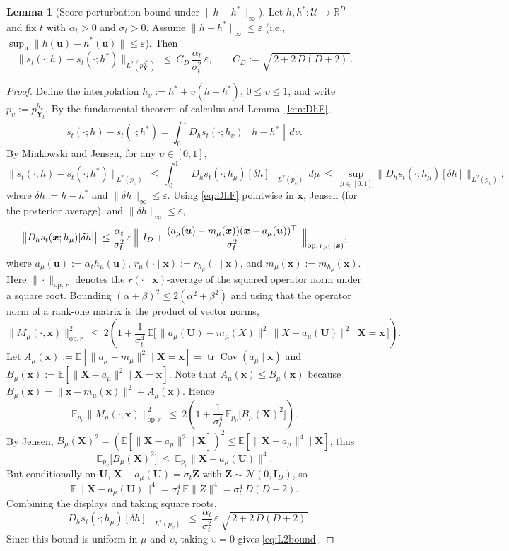 \documentclass[12pt]{article}
\theoremstyle{definition} %
\newtheorem{lemma}{Lemma}
\newcommand{\R}{\mathbb{R}}
\newcommand{\X}{\bm X}
\newcommand{\Cov}{\operatorname{Cov}}
\providecommand{\E}{\mathbb{E}}
\begin{document}
\begin{lemma}[Score perturbation bound under $\|h-h^*\|_\infty$]\label{thm:score-perturb}
Let $h,h^*:\mathcal U\to\R^D$ and fix $t$ with $\alpha_t>0$ and $\sigma_t>0$.
Assume $\|h-h^*\|_\infty\le \varepsilon$ (i.e., $\sup_{\bm u}\|h(\bm u)-h^*(\bm u)\|\le\varepsilon$).
Then 
\begin{equation}\label{eq:L2bound}
\big\|s_t(\cdot;h)-s_t(\cdot;h^*)\big\|_{L^2(p_{\bm Y_t}^{h^*})}
\ \le\ C_D\,\frac{\alpha_t}{\sigma_t^2}\,\varepsilon,
\qquad
C_D:=\sqrt{\,2+2\,D(D+2)\,}.
\end{equation}
\end{lemma}
\begin{proof}
Define the interpolation $h_\upsilon:=h^*+\upsilon(h-h^*)$, $0\le\upsilon\le1$,
and write $p_\upsilon:=p_{\bm Y_t}^{h_\upsilon}$.
By the fundamental theorem of calculus and Lemma~\ref{lem:DhF},
\[
s_t(\cdot;h)-s_t(\cdot;h^*)=\int_0^1 D_h s_t(\cdot;h_\upsilon)[\,h-h^*\,]\,d\upsilon.
\]
By Minkowski and Jensen, for any $\upsilon\in[0,1]$,
\[
\|s_t(\cdot;h)-s_t(\cdot;h^*)\|_{L^2(p_\upsilon)}
\ \le\ \int_0^1 \|D_h s_t(\cdot;h_\mu)[\delta h]\|_{L^2(p_\upsilon)}\,d\mu
\ \le\ \sup_{\mu\in[0,1]}\|D_h s_t(\cdot;h_\mu)[\delta h]\|_{L^2(p_\upsilon)},
\]
where $\delta h:=h-h^*$ and $\|\delta h\|_\infty\le\varepsilon$.
Using \eqref{eq:DhF} pointwise in $\bm x$, Jensen (for the posterior average), and $\|\delta h\|_\infty\le\varepsilon$,
\[
\big\|D_h s_t(\bm x;h_\mu)[\delta h]\big\|
\le \frac{\alpha_t}{\sigma_t^2}\,\varepsilon\,
\Bigl\|\ I_D+\frac{(a_\mu(\bm u)-m_\mu(\bm x))(\bm x-a_\mu(\bm u))^\top}{\sigma_t^2}\ \Bigr\|_{\text{op},\,r_\mu(\cdot\mid \bm x)},
\]
where $a_\mu(\bm u):=\alpha_t h_\mu(\bm u)$, $r_\mu(\cdot\mid \bm x):=r_{h_\mu}(\cdot\mid \bm x)$, and $m_\mu(\bm x):=m_{h_\mu}(\bm x)$.
Here $\|\cdot\|_{\text{op},\,r}$ denotes the $r(\cdot\mid \bm x)$-average of the squared operator norm under a square root.
Bounding $(\alpha+\beta)^2\le 2(\alpha^2+\beta^2)$ and using that the operator norm of a rank-one matrix
is the product of vector norms,
\[
\|M_\mu(\cdot,\bm x)\|_{\mathrm{op},r}^2
\ \le\ 2\left(1+\frac{1}{\sigma_t^4}\,\E\big[\,\|a_\mu(\bm U)-m_\mu(X)\|^2\,\|X-a_\mu(\bm U)\|^2\ \big|\X=\bm x\,\big]\right).
\]
Let $A_\mu(\bm x):=\E[\|a_\mu-m_\mu\|^2\mid \X=\bm x]=\operatorname{tr}\Cov(a_\mu\mid \bm x)$ and
$B_\mu(\bm x):=\E[\|\X-a_\mu\|^2\mid \X=\bm x]$. Note that $A_\mu(\bm x)\le B_\mu(\bm x)$ because
$B_\mu(\bm x)=\|\bm x-m_\mu(\bm x)\|^2+A_\mu(\bm x)$. Hence
\[
\E_{p_\upsilon}\|M_\mu(\cdot,\bm x)\|_{\mathrm{op},r}^2
\ \le\ 2\left(1+\frac{1}{\sigma_t^4}\,\E_{p_\upsilon}\big[B_\mu(\X)^2\big]\right).
\]
By Jensen, $B_\mu(\X)^2=(\E[\|\X-a_\mu\|^2\mid \X])^2\le \E[\|\X-a_\mu\|^4\mid \X]$, thus
\[
\E_{p_\upsilon}\big[B_\mu(\X)^2\big]\ \le\ \E_{p_\upsilon}\|\X-a_\mu(\bm U)\|^4.
\]
But conditionally on $\bm U$, $\X-a_\mu(\bm U)=\sigma_t \bm Z$ with $\bm Z\sim\mathcal N(0,\bm{I}_D)$, so
\[
\E\|\X-a_\mu(\bm U)\|^4=\sigma_t^4\,\E\|Z\|^4=\sigma_t^4\,D(D+2).
\]
Combining the displays and taking square roots,
\[
\|D_h s_t(\cdot;h_\mu)[\delta h]\|_{L^2(p_\upsilon)}
\ \le\ \frac{\alpha_t}{\sigma_t^2}\,\varepsilon\,\sqrt{\,2+2\,D(D+2)\,}.
\]
Since this bound is uniform in $\mu$ and $\upsilon$, taking $\upsilon=0$ gives \eqref{eq:L2bound}.
\end{proof}
\end{document}
